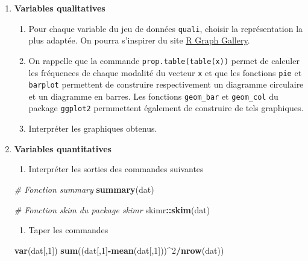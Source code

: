 \documentclass[
]{article}
\newenvironment{Shaded}{\begin{snugshade}}{\end{snugshade}}
\newcommand{\CommentTok}[1]{\textcolor[rgb]{0.56,0.35,0.01}{\textit{#1}}}
\newcommand{\DecValTok}[1]{\textcolor[rgb]{0.00,0.00,0.81}{#1}}
\newcommand{\FunctionTok}[1]{\textcolor[rgb]{0.13,0.29,0.53}{\textbf{#1}}}
\newcommand{\NormalTok}[1]{#1}
\newcommand{\SpecialCharTok}[1]{\textcolor[rgb]{0.81,0.36,0.00}{\textbf{#1}}}
\providecommand{\tightlist}{%
  \setlength{\itemsep}{0pt}\setlength{\parskip}{0pt}}
\begin{document}
\begin{enumerate}
\def\labelenumi{\arabic{enumi}.}
\item
  \textbf{Variables qualitatives}

  \begin{enumerate}
  \def\labelenumii{\alph{enumii}.}
  \item
    Pour chaque variable du jeu de données \texttt{quali}, choisir la
    représentation la plus adaptée. On pourra s'inspirer du site
    \href{https://r-graph-gallery.com/}{R Graph Gallery}.
  \item
    On rappelle que la commande \texttt{prop.table(table(x))} permet de
    calculer les fréquences de chaque modalité du vecteur \texttt{x} et
    que les fonctions \texttt{pie} et \texttt{barplot} permettent de
    construire respectivement un diagramme circulaire et un diagramme en
    barres. Les fonctions \texttt{geom\_bar} et \texttt{geom\_col} du
    package \texttt{ggplot2} permmettent également de construire de tels
    graphiques.
  \item
    Interpréter les graphiques obtenus.
  \end{enumerate}
\item
  \textbf{Variables quantitatives}

  \begin{enumerate}
  \def\labelenumii{\alph{enumii}.}
  \tightlist
  \item
    Interpréter les sorties des commandes suivantes
  \end{enumerate}

\begin{Shaded}
\begin{Highlighting}[]
\CommentTok{\# Fonction summary}
\FunctionTok{summary}\NormalTok{(dat)}

\CommentTok{\# Fonction skim du package skimr}
\NormalTok{skimr}\SpecialCharTok{::}\FunctionTok{skim}\NormalTok{(dat)}
\end{Highlighting}
\end{Shaded}

  \begin{enumerate}
  \def\labelenumii{\alph{enumii}.}
  \setcounter{enumii}{1}
  \tightlist
  \item
    Taper les commandes
  \end{enumerate}

\begin{Shaded}
\begin{Highlighting}[]
\FunctionTok{var}\NormalTok{(dat[,}\DecValTok{1}\NormalTok{])}
\FunctionTok{sum}\NormalTok{((dat[,}\DecValTok{1}\NormalTok{]}\SpecialCharTok{{-}}\FunctionTok{mean}\NormalTok{(dat[,}\DecValTok{1}\NormalTok{]))}\SpecialCharTok{\^{}}\DecValTok{2}\SpecialCharTok{/}\FunctionTok{nrow}\NormalTok{(dat))}
\end{Highlighting}
\end{Shaded}


\end{enumerate}
\end{document}
